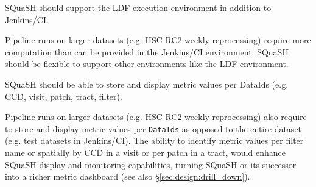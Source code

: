 \begin{recommendation}
SQuaSH should support the LDF execution environment in addition to Jenkins/CI.
\end{recommendation}

Pipeline runs on larger datasets (e.g. HSC RC2 weekly reprocessing) require more computation than can be provided in the Jenkins/CI environment. SQuaSH should be flexible to support other environments like the LDF environment.

\begin{recommendation}
SQuaSH should be able to store and display metric values per DataIds (e.g. CCD, visit, patch, tract, filter).
\end{recommendation}

Pipeline runs on larger datasets (e.g. HSC RC2 weekly reprocessing) also require to store and display metric values per \texttt{DataIds} as opposed to the entire dataset (e.g. test datasets in Jenkins/CI). The ability to identify metric values per filter name or spatially by CCD in a visit or per patch in a tract, would enhance SQuaSH display and monitoring capabilities, turning SQuaSH or its successor into a richer metric dashboard (see also \S\ref{sec:design:drill_down}).
